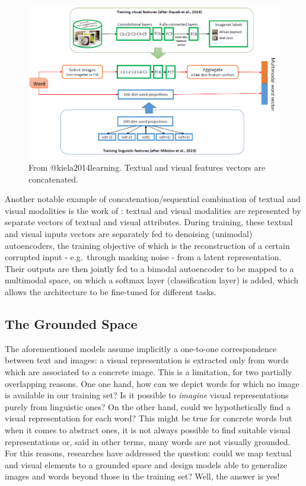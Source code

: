 \documentclass[
]{krantz}
\begin{document}
\begin{figure}

{\centering \includegraphics[width=1\linewidth]{figures/02-03-img-support-text/img-kiela2014-01} 

}

\caption{From @kiela2014learning. Textual and visual features vectors are concatenated.}\label{fig:img-kiela2014-01}
\end{figure}

Another notable example of concatenation/sequential combination of textual and visual modalities is the work of \citet{silberer2014learning}: textual and visual modalities are represented by separate vectors of textual and visual attributes. During training, these textual and visual inputs vectors are separately fed to denoising (unimodal) autoencoders, the training objective of which is the reconstruction of a certain corrupted input - e.g.~through masking noise - from a latent representation. Their outputs are then jointly fed to a bimodal autoencoder to be mapped to a multimodal space, on which a softmax layer (classification layer) is added, which allows the architecture to be fine-tuned for different tasks.

\hypertarget{the-grounded-space}{%
\subsection{The Grounded Space}\label{the-grounded-space}}

The aforementioned models assume implicitly a one-to-one correspondence between text and images: a visual representation is extracted only from words which are associated to a concrete image. This is a limitation, for two partially overlapping reasons. One one hand, how can we depict words for which no image is available in our training set? Is it possible to \emph{imagine} visual representations purely from linguistic ones? On the other hand, could we hypothetically find a visual representation for each word? This might be true for concrete words but when it comes to abstract ones, it is not always possible to find suitable visual representations or, said in other terms, many words are not visually grounded. For this reasons, researches have addressed the question: could we map textual and visual elements to a grounded space and design models able to generalize images and words beyond those in the training set? Well, the answer is yes!
\end{document}
